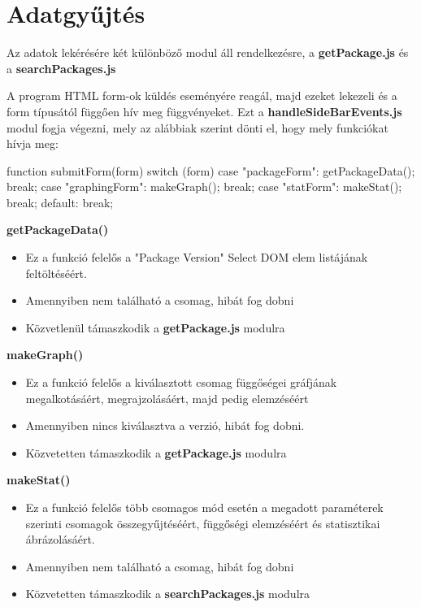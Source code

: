 \pagebreak

\section{Adatgyűjtés}

Az adatok lekérésére két különböző modul áll rendelkezésre, a \textbf{getPackage.js} és a \textbf{searchPackages.js}

A program HTML form-ok küldés eseményére reagál, majd ezeket lekezeli és a form típusától függően hív meg függvényeket. Ezt a \textbf{handleSideBarEvents.js} modul fogja végezni, mely az alábbiak szerint dönti el, hogy mely funkciókat hívja meg:

\begin{cpp}
function submitForm(form){
	switch (form) {
		case "packageForm":
		getPackageData();
		break;
		case "graphingForm":
		makeGraph();
		break;
		case "statForm":
		makeStat();
		break;
		default:
		break;
	}
}
\end{cpp}

\noindent\textbf{getPackageData()}
\begin{itemize}
	\item Ez a funkció felelős a "Package Version" Select DOM elem listájának feltöltéséért. 
	\item Amennyiben nem található a csomag, hibát fog dobni
	\item Közvetlenül támaszkodik a \textbf{getPackage.js} modulra
\end{itemize}

\noindent\textbf{makeGraph()}
\begin{itemize}
	\item Ez a funkció felelős a kiválasztott csomag függőségei gráfjának megalkotásáért, megrajzolásáért, majd pedig elemzéséért
	\item Amennyiben nincs kiválasztva a verzió, hibát fog dobni.
	\item Közvetetten támaszkodik a \textbf{getPackage.js} modulra
\end{itemize}

\noindent\textbf{makeStat()}
\begin{itemize}
	\item Ez a funkció felelős több csomagos mód esetén a megadott paraméterek szerinti csomagok összegyűjtéséért, függőségi elemzéséért és statisztikai ábrázolásáért.
	\item Amennyiben nem található a csomag, hibát fog dobni
	\item Közvetetten támaszkodik a \textbf{searchPackages.js} modulra
\end{itemize}

